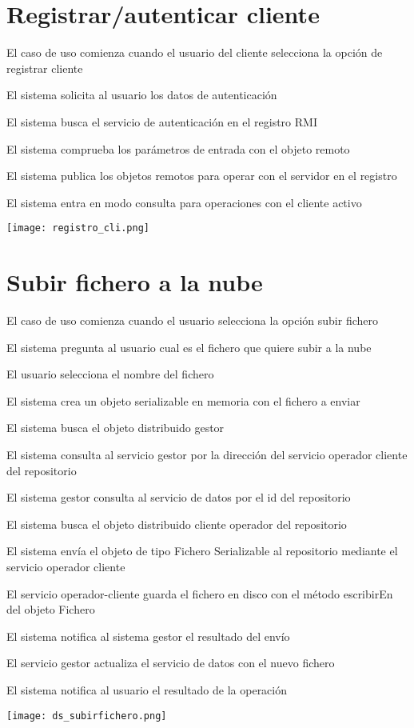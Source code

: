\section{Registrar/autenticar cliente}

\begin{compactenum}
	\item El caso de uso comienza cuando el usuario del cliente selecciona la opción de registrar cliente
	\item El sistema solicita al usuario los datos de autenticación
	\item El sistema busca el servicio de autenticación en el registro RMI
	\item El sistema comprueba los parámetros de entrada con el objeto remoto
	\item El sistema publica los objetos remotos para operar con el servidor en el registro
	\item El sistema entra en modo consulta para operaciones con el cliente activo
\end{compactenum}
\texttt{[image: registro\_cli.png]}

\section{Subir fichero a la nube}
\begin{compactenum}
	\item El caso de uso comienza cuando el usuario selecciona la opción subir fichero
	\item El sistema pregunta al usuario cual es el fichero que quiere subir a la nube
	\item El usuario selecciona el nombre del fichero
	\item El sistema crea un objeto serializable en memoria con el fichero a enviar
	\item El sistema busca el objeto distribuido gestor
	\item El sistema consulta al servicio gestor por la dirección del servicio operador cliente del repositorio
	\item El sistema gestor consulta al servicio de datos por el id del repositorio
	\item El sistema busca el objeto distribuido cliente operador del repositorio
	\item El sistema envía el objeto de tipo Fichero Serializable al repositorio mediante el servicio operador cliente
	\item El servicio operador-cliente guarda el fichero en disco con el método escribirEn del objeto Fichero
	\item El sistema notifica al sistema gestor el resultado del envío
	\item El servicio gestor actualiza el servicio de datos con el nuevo fichero
	\item El sistema notifica al usuario el resultado de la operación
\end{compactenum}
\texttt{[image: ds\_subirfichero.png]}

